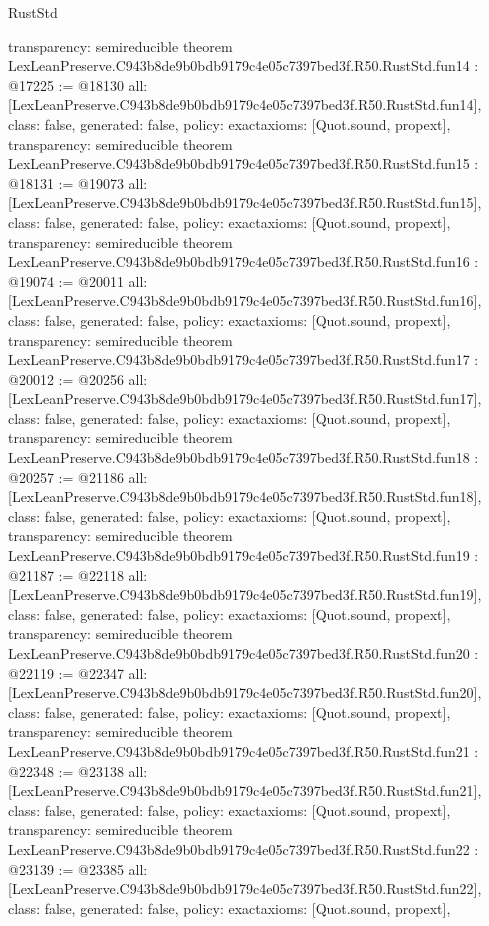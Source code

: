 \begin{lexlean}{RustStd}
\begin{coremodule}
{  transparency: semireducible
}
theorem LexLeanPreserve.C943b8de9b0bdb9179c4e05c7397bed3f.R50.RustStd.fun14 : @17225 := @18130 {
  all: [LexLeanPreserve.C943b8de9b0bdb9179c4e05c7397bed3f.R50.RustStd.fun14],
  class: false,
  generated: false,
  policy: exact{axioms: [Quot.sound, propext]},
  transparency: semireducible
}
theorem LexLeanPreserve.C943b8de9b0bdb9179c4e05c7397bed3f.R50.RustStd.fun15 : @18131 := @19073 {
  all: [LexLeanPreserve.C943b8de9b0bdb9179c4e05c7397bed3f.R50.RustStd.fun15],
  class: false,
  generated: false,
  policy: exact{axioms: [Quot.sound, propext]},
  transparency: semireducible
}
theorem LexLeanPreserve.C943b8de9b0bdb9179c4e05c7397bed3f.R50.RustStd.fun16 : @19074 := @20011 {
  all: [LexLeanPreserve.C943b8de9b0bdb9179c4e05c7397bed3f.R50.RustStd.fun16],
  class: false,
  generated: false,
  policy: exact{axioms: [Quot.sound, propext]},
  transparency: semireducible
}
theorem LexLeanPreserve.C943b8de9b0bdb9179c4e05c7397bed3f.R50.RustStd.fun17 : @20012 := @20256 {
  all: [LexLeanPreserve.C943b8de9b0bdb9179c4e05c7397bed3f.R50.RustStd.fun17],
  class: false,
  generated: false,
  policy: exact{axioms: [Quot.sound, propext]},
  transparency: semireducible
}
theorem LexLeanPreserve.C943b8de9b0bdb9179c4e05c7397bed3f.R50.RustStd.fun18 : @20257 := @21186 {
  all: [LexLeanPreserve.C943b8de9b0bdb9179c4e05c7397bed3f.R50.RustStd.fun18],
  class: false,
  generated: false,
  policy: exact{axioms: [Quot.sound, propext]},
  transparency: semireducible
}
theorem LexLeanPreserve.C943b8de9b0bdb9179c4e05c7397bed3f.R50.RustStd.fun19 : @21187 := @22118 {
  all: [LexLeanPreserve.C943b8de9b0bdb9179c4e05c7397bed3f.R50.RustStd.fun19],
  class: false,
  generated: false,
  policy: exact{axioms: [Quot.sound, propext]},
  transparency: semireducible
}
theorem LexLeanPreserve.C943b8de9b0bdb9179c4e05c7397bed3f.R50.RustStd.fun20 : @22119 := @22347 {
  all: [LexLeanPreserve.C943b8de9b0bdb9179c4e05c7397bed3f.R50.RustStd.fun20],
  class: false,
  generated: false,
  policy: exact{axioms: [Quot.sound, propext]},
  transparency: semireducible
}
theorem LexLeanPreserve.C943b8de9b0bdb9179c4e05c7397bed3f.R50.RustStd.fun21 : @22348 := @23138 {
  all: [LexLeanPreserve.C943b8de9b0bdb9179c4e05c7397bed3f.R50.RustStd.fun21],
  class: false,
  generated: false,
  policy: exact{axioms: [Quot.sound, propext]},
  transparency: semireducible
}
theorem LexLeanPreserve.C943b8de9b0bdb9179c4e05c7397bed3f.R50.RustStd.fun22 : @23139 := @23385 {
  all: [LexLeanPreserve.C943b8de9b0bdb9179c4e05c7397bed3f.R50.RustStd.fun22],
  class: false,
  generated: false,
  policy: exact{axioms: [Quot.sound, propext]},
}
\end{coremodule}
\end{lexlean}
